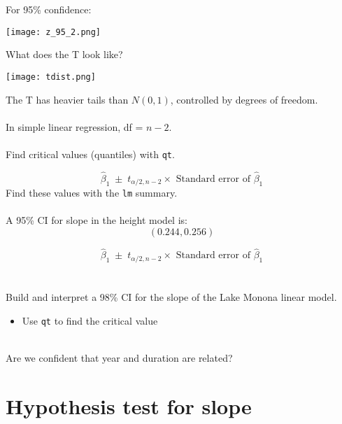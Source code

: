 \documentclass[xcolor={dvipsnames,svgnames},14pt]{beamer}
\begin{document}
\begin{frame}
For 95\% confidence:
\begin{center}
\texttt{[image: z\_95\_2.png]}
\end{center}
\end{frame}

\begin{frame}
What does the T look like?
\begin{center}
\texttt{[image: tdist.png]}
\end{center}
\end{frame}

\begin{frame}
The T has heavier tails than $N(0, 1)$, controlled by degrees of freedom. \\~\\

In simple linear regression, df = $n-2$. \\~\\

Find critical values (quantiles) with \texttt{qt}.
\end{frame}

\begin{frame}
$$\hat{\beta}_1 \;\pm\; t_{\alpha/2, n-2} \times \text{ Standard error of }\hat{\beta}_1$$
Find these values with the \texttt{lm} summary.\\~\\ 

A 95\% CI for slope in the height model is:
$$(0.244, 0.256)$$
\end{frame}

\begin{frame}
$$\hat{\beta}_1 \;\pm\; t_{\alpha/2, n-2} \times \text{ Standard error of }\hat{\beta}_1$$ \\~\\

Build and interpret a 98\% CI for the slope of the Lake Monona linear model. \begin{itemize}
\item Use \texttt{qt} to find the critical value \\~\\
\end{itemize}
Are we confident that year and duration are related?
\end{frame}

\section{Hypothesis test for slope}
\end{document}
